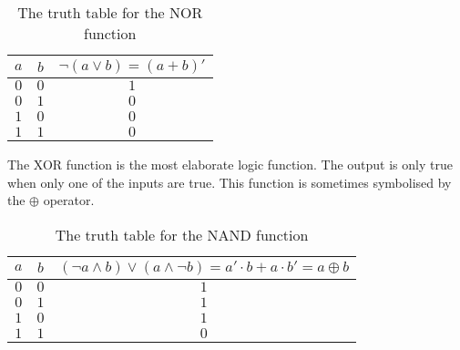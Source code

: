 \begin{table}[ht]
    \centering
    \begin{tabular}{cc|c}
        $a$ & $b$ & $\lnot(a \lor b) = (a + b)'$ \\
        \hline
        $0$ & $0$ & $1$ \\
        $0$ & $1$ & $0$ \\
        $1$ & $0$ & $0$ \\
        $1$ & $1$ & $0$ \\
    \end{tabular}
    \caption{The truth table for the NOR function}
\end{table}

The XOR function is the most elaborate logic function. The output is only true when only one of the 
inputs are true. This function is sometimes symbolised by the $\oplus$ operator.

\begin{table}[ht]
    \centering
    \begin{tabular}{cc|c}
        $a$ & $b$ & $(\lnot a \land b) \lor (a \land \lnot b) = a'\cdot b + a\cdot b' = a \oplus b$ \\
        \hline
        $0$ & $0$ & $1$ \\
        $0$ & $1$ & $1$ \\
        $1$ & $0$ & $1$ \\
        $1$ & $1$ & $0$ \\
    \end{tabular}
    \caption{The truth table for the NAND function}
\end{table}